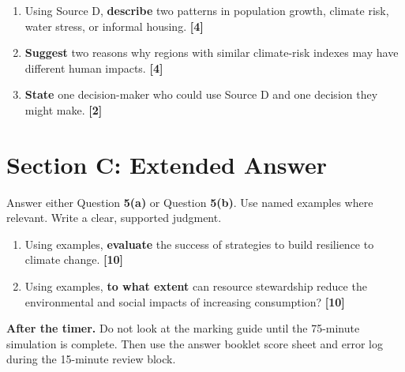 \documentclass[11pt,a4paper]{article}
\newcommand{\term}[1]{\textcolor{HeadingBlue}{\textbf{#1}}}
\newcommand{\exam}[1]{\textcolor{AccentTeal}{\textbf{#1}}}
\newcommand{\markpts}[1]{\hfill\textbf{[#1]}}
\newcommand{\boxnote}[3]{%
\noindent\colorbox{#1}{%
  \begin{minipage}{0.965\textwidth}
  \sffamily
  \textbf{\textcolor{HeadingBlue}{#2}} #3
  \end{minipage}
}}
\begin{document}
\begin{enumerate}[label=\textbf{4(\alph*)}]
  \item Using Source D, \exam{describe} two patterns in population growth,
  climate risk, water stress, or informal housing. \markpts{4}

  \item \exam{Suggest} two reasons why regions with similar climate-risk
  indexes may have different human impacts. \markpts{4}

  \item \exam{State} one decision-maker who could use Source D and one decision
  they might make. \markpts{2}
\end{enumerate}

\newpage

\section{Section C: Extended Answer}

Answer either Question \term{5(a)} or Question \term{5(b)}. Use named examples
where relevant. Write a clear, supported judgment.

\begin{enumerate}[label=\textbf{5(\alph*)}]
  \item Using examples, \exam{evaluate} the success of strategies to build
  resilience to climate change. \markpts{10}

  \item Using examples, \exam{to what extent} can resource stewardship reduce
  the environmental and social impacts of increasing consumption? \markpts{10}
\end{enumerate}

\vfill

\boxnote{SoftBlue}{After the timer.}{Do not look at the marking guide until
the 75-minute simulation is complete. Then use the answer booklet score sheet
and error log during the 15-minute review block.}
\end{document}
